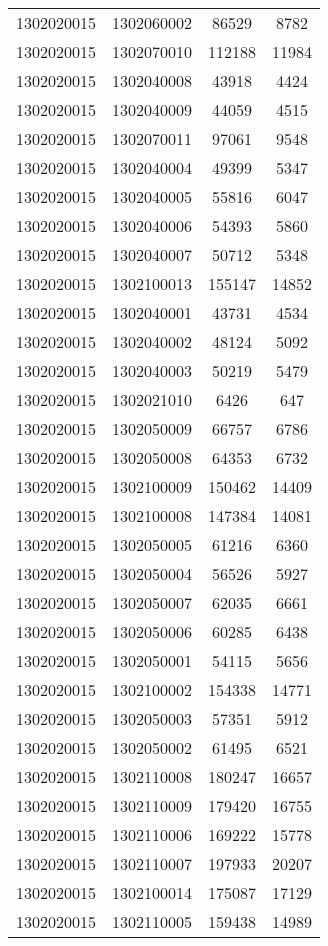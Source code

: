 \begin{longtable}[h]{llcc}
		1302020015 & 1302060002 & 86529 & 8782\\
		1302020015 & 1302070010 & 112188 & 11984\\
		1302020015 & 1302040008 & 43918 & 4424\\
		1302020015 & 1302040009 & 44059 & 4515\\
		1302020015 & 1302070011 & 97061 & 9548\\
		1302020015 & 1302040004 & 49399 & 5347\\
		1302020015 & 1302040005 & 55816 & 6047\\
		1302020015 & 1302040006 & 54393 & 5860\\
		1302020015 & 1302040007 & 50712 & 5348\\
		1302020015 & 1302100013 & 155147 & 14852\\
		1302020015 & 1302040001 & 43731 & 4534\\
		1302020015 & 1302040002 & 48124 & 5092\\
		1302020015 & 1302040003 & 50219 & 5479\\
		1302020015 & 1302021010 & 6426 & 647\\
		1302020015 & 1302050009 & 66757 & 6786\\
		1302020015 & 1302050008 & 64353 & 6732\\
		1302020015 & 1302100009 & 150462 & 14409\\
		1302020015 & 1302100008 & 147384 & 14081\\
		1302020015 & 1302050005 & 61216 & 6360\\
		1302020015 & 1302050004 & 56526 & 5927\\
		1302020015 & 1302050007 & 62035 & 6661\\
		1302020015 & 1302050006 & 60285 & 6438\\
		1302020015 & 1302050001 & 54115 & 5656\\
		1302020015 & 1302100002 & 154338 & 14771\\
		1302020015 & 1302050003 & 57351 & 5912\\
		1302020015 & 1302050002 & 61495 & 6521\\
		1302020015 & 1302110008 & 180247 & 16657\\
		1302020015 & 1302110009 & 179420 & 16755\\
		1302020015 & 1302110006 & 169222 & 15778\\
		1302020015 & 1302110007 & 197933 & 20207\\
		1302020015 & 1302100014 & 175087 & 17129\\
		1302020015 & 1302110005 & 159438 & 14989\\

\end{longtable}

